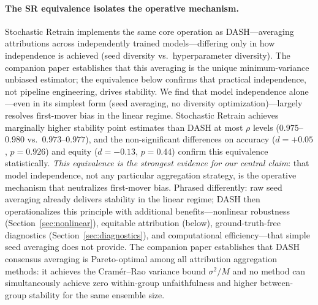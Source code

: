 \documentclass[11pt]{article}
\newcommand{\dash}{\textsc{DASH}}
\newcommand{\rhovar}{\rho}
\begin{document}
\paragraph{The SR equivalence isolates the operative mechanism.}
Stochastic Retrain implements the same core operation as
\dash{}---averaging attributions across independently trained
models---differing only in how independence is achieved (seed diversity
vs.\ hyperparameter diversity).  The companion paper
\citep{caraker2026impossibility} establishes that this averaging is the unique
minimum-variance unbiased estimator; the equivalence below confirms
that practical independence, not pipeline engineering, drives stability.
We find that model independence alone---even in its simplest form (seed
averaging, no diversity optimization)---largely resolves first-mover
bias in the linear regime.  Stochastic Retrain achieves marginally
higher stability point estimates than \dash{} at most $\rhovar$ levels
($0.975$--$0.980$ vs.\ $0.973$--$0.977$), and the non-significant
differences on accuracy ($d = +0.05$, $p = 0.926$) and equity
($d = -0.13$, $p = 0.44$) confirm this equivalence statistically.
\emph{This equivalence is the strongest evidence for our central claim}:
that model independence, not any particular aggregation strategy, is the
operative mechanism that neutralizes first-mover bias.  Phrased differently:
raw seed averaging already delivers stability in the linear regime;
\dash{} then operationalizes this principle with additional
benefits---nonlinear robustness (Section~\ref{sec:nonlinear}), equitable
attribution (below), ground-truth-free diagnostics
(Section~\ref{sec:diagnostics}), and computational efficiency---that
simple seed averaging does not provide.
The companion paper \citep{caraker2026impossibility} establishes that
\dash{} consensus averaging is Pareto-optimal among all attribution
aggregation methods: it achieves the Cram\'er--Rao variance bound
$\sigma^2/M$ and no method can simultaneously achieve zero
within-group unfaithfulness and higher between-group stability for the
same ensemble size.
\end{document}
